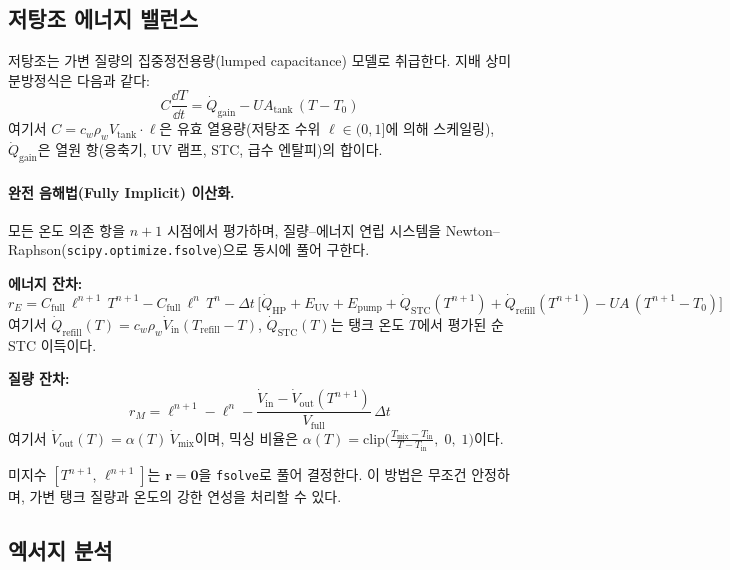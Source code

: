 \subsection{저탕조 에너지 밸런스}
\label{sec:ashpb-tank}

저탕조는 가변 질량의 집중정전용량(lumped capacitance) 모델로 취급한다.
지배 상미분방정식은 다음과 같다:
\begin{equation}\label{eq:ashp-tank-ode}
  C \frac{\dd T}{\dd t} = \dot{Q}_\text{gain} - UA_\text{tank}\,(T - T_0)
\end{equation}
여기서 $C = c_w \rho_w V_\text{tank} \cdot \ell$은 유효 열용량(저탕조 수위 $\ell \in (0,1]$에 의해 스케일링),
$\dot{Q}_\text{gain}$은 열원 항(응축기, UV 램프, STC, 급수 엔탈피)의 합이다.

\paragraph{완전 음해법(Fully Implicit) 이산화.}
모든 온도 의존 항을 $n{+}1$ 시점에서 평가하며, 질량--에너지 연립 시스템을
Newton--Raphson(\texttt{scipy.optimize.fsolve})으로 동시에 풀어 구한다.

\textbf{에너지 잔차:}
\begin{equation}\label{eq:ashp-implicit-energy}
  r_E = C_\text{full}\,\ell^{n+1}\,T^{n+1}
      - C_\text{full}\,\ell^{n}\,T^{n}
      - \Delta t\,\bigl[
          \dot{Q}_\text{HP} + E_\text{UV} + E_\text{pump}
          + \dot{Q}_\text{STC}(T^{n+1})
          + \dot{Q}_\text{refill}(T^{n+1})
          - UA\,(T^{n+1} - T_0)
        \bigr]
\end{equation}
여기서
$\dot{Q}_\text{refill}(T) = c_w \rho_w \dot{V}_\text{in}(T_\text{refill} - T)$,
$\dot{Q}_\text{STC}(T)$는 탱크 온도 $T$에서 평가된 순 STC 이득이다.

\textbf{질량 잔차:}
\begin{equation}\label{eq:ashp-implicit-mass}
  r_M = \ell^{n+1} - \ell^{n}
      - \frac{\dot{V}_\text{in} - \dot{V}_\text{out}(T^{n+1})}{V_\text{full}}\,\Delta t
\end{equation}
여기서 $\dot{V}_\text{out}(T) = \alpha(T)\,\dot{V}_\text{mix}$이며,
믹싱 비율은
$\alpha(T) = \text{clip}\bigl(\frac{T_\text{mix}-T_\text{in}}{T - T_\text{in}},\;0,\;1\bigr)$이다.

미지수 $[T^{n+1},\,\ell^{n+1}]$는 $\mathbf{r} = \mathbf{0}$을
\texttt{fsolve}로 풀어 결정한다.
이 방법은 무조건 안정하며, 가변 탱크 질량과 온도의 강한 연성을 처리할 수 있다.

\subsection{엑서지 분석}

